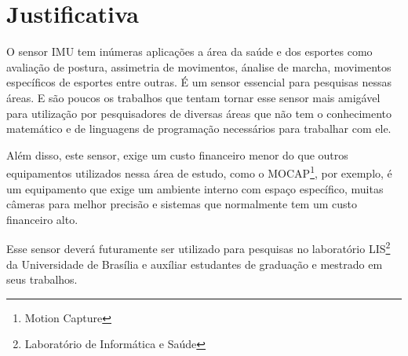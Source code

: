 \section{Justificativa}

O sensor IMU tem inúmeras aplicações a área da saúde e dos esportes como avaliação de postura, assimetria de movimentos, ánalise de marcha, movimentos específicos de esportes entre outras. É um sensor essencial para pesquisas nessas áreas. E são poucos os trabalhos que tentam tornar esse sensor mais amigável para utilização por pesquisadores de diversas áreas que não tem o conhecimento matemático e de linguagens de programação necessários para trabalhar com ele. 

Além disso, este sensor, exige um custo financeiro menor do que outros equipamentos utilizados nessa área de estudo, como o MOCAP\footnote{Motion Capture}, por exemplo, é um equipamento que exige um ambiente interno com espaço específico, muitas câmeras para melhor precisão e sistemas que normalmente tem um custo financeiro alto. 

Esse sensor deverá futuramente ser utilizado para  pesquisas no laboratório LIS\footnote{Laboratório de Informática e Saúde} da Universidade de Brasília e auxíliar estudantes de graduação e mestrado em seus trabalhos.